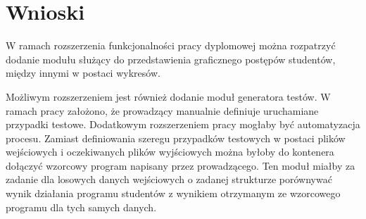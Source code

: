 \chapter{Wnioski}
\label{chapter:conclusion}

W ramach rozszerzenia funkcjonalności pracy dyplomowej można rozpatrzyć dodanie modułu służący do przedstawienia graficznego postępów studentów, między innymi w postaci wykresów.

Możliwym rozszerzeniem jest również dodanie moduł generatora testów.
W ramach pracy założono, że prowadzący manualnie definiuje uruchamiane przypadki testowe.
Dodatkowym rozszerzeniem pracy mogłaby być automatyzacja procesu.
Zamiast definiowania szeregu przypadków testowych w postaci plików wejściowych i oczekiwanych plików wyjściowych można byłoby do kontenera dołączyć wzorcowy program napisany przez prowadzącego.
Ten moduł miałby za zadanie dla losowych danych wejściowych o zadanej strukturze porównywać wynik działania programu studentów z wynikiem otrzymanym ze wzorcowego programu dla tych samych danych.
